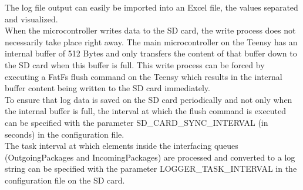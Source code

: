 %
The log file output can easily be imported into an Excel file, the values separated and visualized.\\
When the microcontroller writes data to the SD card, the write process does not necessarily take place right away. The main microcontroller on the Teensy has an internal buffer of 512 Bytes and only transfers the content of that buffer down to the SD card when this buffer is full. This write process can be forced by executing a FatFs flush command on the Teensy which results in the internal buffer content being written to the SD card immediately.\\
To ensure that log data is saved on the SD card periodically and not only when the internal buffer is full, the interval at which the flush command is executed can be specified with the parameter SD\_CARD\_SYNC\_INTERVAL (in seconds) in the configuration file.\\
The task interval at which elements inside the interfacing queues (OutgoingPackages and IncomingPackages) are processed and converted to a log string can be specified with the parameter LOGGER\_TASK\_INTERVAL in the configuration file on the SD card.
%
